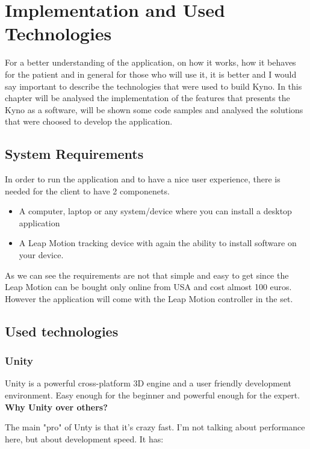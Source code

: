 \section{ Implementation and Used Technologies}

For a better understanding of the application, on how it works, how it behaves for the patient and in general for those who will use it, it is better and I would say important to describe the technologies that were used to build Kyno. In this chapter will be analysed the implementation of the features that presents the Kyno as a software, will be shown some code samples and analysed the solutions that were choosed to develop the application.

\subsection{System Requirements}
In order to run the application and to have a nice user experience, there is needed for the client to have 2 componenets.

\begin{itemize}
\item A computer, laptop or any system/device where you can install a desktop application

\item A Leap Motion tracking device with again the ability to install software on your device.
\end{itemize}

As we can see the requirements are not that simple and easy to get since the Leap Motion can be bought only online from USA and cost almost 100 euros. However the application will come with the Leap Motion controller in the set.

\subsection {Used technologies}
\subsubsection {Unity}
Unity is a powerful cross-platform 3D engine and a user friendly development environment. Easy enough for the beginner and powerful enough for the expert.
\\
\textbf{Why Unity over others?}

The main "pro" of Unty is that it's crazy fast. I'm not talking about performance here, but about development speed. It has:

